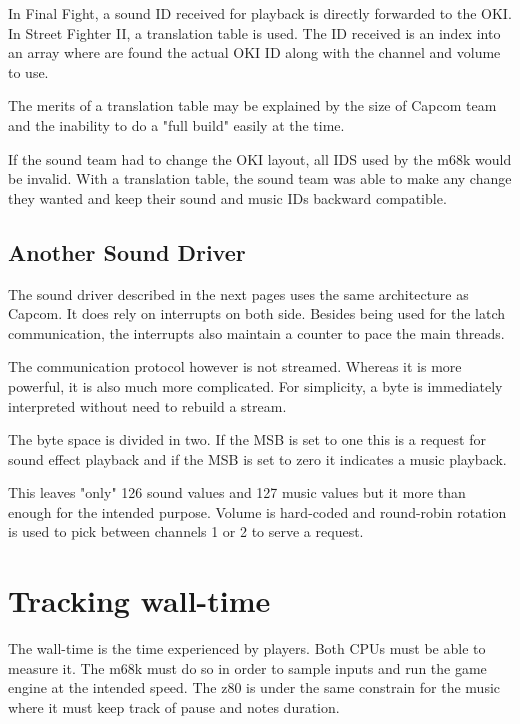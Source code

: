 In Final Fight, a sound ID received for playback is directly forwarded to the OKI. In Street Fighter II, a translation table is used. The ID received is an index into an array where are found the actual OKI ID along with the channel and volume to use.

The merits of a translation table may be explained by the size of Capcom team and the inability to do a "full build" easily at the time.

If the sound team had to change the OKI layout, all IDS used by the m68k would be invalid. With a translation table, the sound team was able to make any change they wanted and keep their sound and music IDs backward compatible.


\subsection{Another Sound Driver}

The sound driver described in the next pages uses the same architecture as Capcom. It does rely on interrupts on both side. Besides being used for the latch communication, the interrupts also maintain a counter to pace the main threads.


The communication protocol however is not streamed. Whereas it is more powerful, it is also much more complicated. For simplicity, a byte is immediately interpreted without need to rebuild a stream.

The byte space is divided in two. If the MSB is set to one  this is a request for sound effect playback and if the MSB is set to zero  it indicates a music playback. 

This leaves "only" 126 sound values and 127 music values but it more than enough for the intended purpose. Volume is hard-coded and round-robin rotation is used to pick between channels 1 or 2 to serve a request. 



\section{Tracking wall-time}
The wall-time is the time experienced by players. Both CPUs must be able to measure it. The m68k must do so in order to sample inputs and run the game engine at the intended speed. The z80 is under the same constrain for the music where it must keep track of pause and notes duration. 

